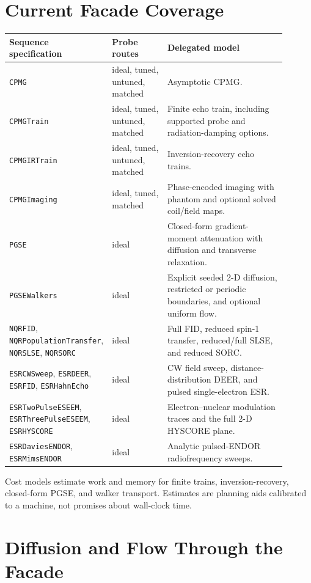 \documentclass[11pt,oneside]{report}
\newcommand{\code}[1]{\texttt{#1}}
\begin{document}
\section{Current Facade Coverage}

\begin{longtable}{p{0.27\linewidth}p{0.20\linewidth}p{0.43\linewidth}}
\toprule
Sequence specification & Probe routes & Delegated model \\
\midrule
\code{CPMG} & ideal, tuned, untuned, matched & Asymptotic CPMG. \\
\code{CPMGTrain} & ideal, tuned, untuned, matched & Finite echo train,
including supported probe and radiation-damping options. \\
\code{CPMGIRTrain} & ideal, tuned, untuned, matched & Inversion-recovery echo
trains. \\
\code{CPMGImaging} & ideal, tuned, matched & Phase-encoded imaging with
phantom and optional solved coil/field maps. \\
\code{PGSE} & ideal & Closed-form gradient-moment attenuation with diffusion
and transverse relaxation. \\
\code{PGSEWalkers} & ideal & Explicit seeded 2-D diffusion, restricted or
periodic boundaries, and optional uniform flow. \\
\code{NQRFID}, \code{NQRPopulationTransfer}, \code{NQRSLSE}, \code{NQRSORC} &
ideal & Full FID, reduced spin-1 transfer, reduced/full SLSE, and reduced SORC. \\
\code{ESRCWSweep}, \code{ESRDEER}, \code{ESRFID}, \code{ESRHahnEcho} & ideal &
CW field sweep, distance-distribution DEER, and pulsed single-electron ESR. \\
\code{ESRTwoPulseESEEM}, \code{ESRThreePulseESEEM}, \code{ESRHYSCORE} & ideal &
Electron--nuclear modulation traces and the full 2-D HYSCORE plane. \\
\code{ESRDaviesENDOR}, \code{ESRMimsENDOR} & ideal & Analytic pulsed-ENDOR
radiofrequency sweeps. \\
\bottomrule
\end{longtable}

Cost models estimate work and memory for finite trains, inversion-recovery,
closed-form PGSE, and walker transport. Estimates are planning aids calibrated
to a machine, not promises about wall-clock time.

\section{Diffusion and Flow Through the Facade}
\end{document}
